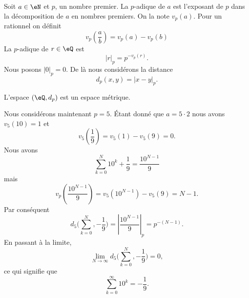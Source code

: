 Soit \( a\in \eN\) et \( p\), un nombre premier. La  \( p\)-adique de \( a\) est l'exposant de \( p\) dans la décomposition de \( a\) en nombres premiers. On la note \( v_p(a)\). Pour un rationnel on définit
\begin{equation}
    v_p\left( \frac{ a }{ b } \right)=v_p(a)-v_p(b)
\end{equation}
La  \( p\)-adique de \( r\in \eQ\) est 
\begin{equation}
    | r |_p=p^{-v_p(r)}.
\end{equation}
Nous posons \( | 0 |_p=0\). De là nous considérons la distance
\begin{equation}
    d_p(x,y)=| x-y |_p.
\end{equation}

\begin{lemma}
    L'espace \( (\eQ,d_p)\) est un espace métrique.
\end{lemma}

Nous considérons maintenant \( p=5\). Étant donné que \( a=5\cdot 2\) nous avons \( v_5(10)=1\) et
\begin{equation}
    v_5\left( \frac{1}{ 9 } \right)=v_5(1)-v_5(9)=0.
\end{equation}
Nous avons
\begin{equation}
    \sum_{k=0}^N10^k+\frac{1}{ 9 }=\frac{ 10^{N-1} }{ 9 }
\end{equation}
mais
\begin{equation}
    v_p\left( \frac{ 10^{N-1} }{ 9 } \right)=v_5(10^{N-1})-v_5(9)=N-1.
\end{equation}
Par conséquent
\begin{equation}
    d_5\big( \sum_{k=0}^N,-\frac{1}{ 9 } \big)=| \frac{ 10^{N-1} }{ 9 } |_p=p^{-(N-1)}.
\end{equation}
En passant à la limite,
\begin{equation}
    \lim_{N\to \infty} d_5\big( \sum_{k=0}^N,-\frac{1}{ 9 } \big)=0,
\end{equation}
ce qui signifie que
\begin{equation}
    \sum_{k=0}^{\infty}10^k=-\frac{1}{ 9 }.
\end{equation}
